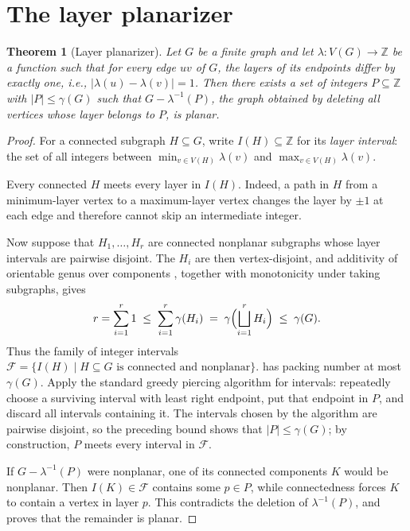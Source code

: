 \documentclass[11pt]{article}
\newtheorem{theorem}{Theorem}[section]
\theoremstyle{definition}
\theoremstyle{remark}
\newcommand{\genus}{\gamma}
\newcommand{\layer}{\lambda}
\begin{document}
\section{The layer planarizer}\label{sec:planarizer}

\begin{theorem}[Layer planarizer]\label{thm:planarizer}
Let $G$ be a finite graph and let $\layer\colon V(G)\to\mathbb{Z}$ be a function such that
for every edge $uv$ of $G$, the layers of its endpoints differ by exactly one, i.e., $|\layer(u)-\layer(v)|=1$. Then there exists
a set of integers $P\subseteq\mathbb{Z}$ with $|P|\le\genus(G)$ such that
$G-\layer^{-1}(P)$, the graph obtained by deleting all vertices whose layer belongs to $P$,
is planar.
\end{theorem}

\begin{proof}
For a connected subgraph $H\subseteq G$, write $I(H)\subseteq\mathbb{Z}$ for its
\emph{layer interval}: the set of all integers between $\min_{v\in V(H)}\layer(v)$ and
$\max_{v\in V(H)}\layer(v)$.

Every connected $H$ meets every layer in $I(H)$.  Indeed, a path in $H$ from a
minimum-layer vertex to a maximum-layer vertex changes the layer by $\pm1$ at each
edge and therefore cannot skip an intermediate integer.

Now suppose that $H_1,\dots,H_r$ are connected nonplanar subgraphs whose layer
intervals are pairwise disjoint.  The $H_i$ are then vertex-disjoint, and additivity
of orientable genus over components \cite{BHKY62}, together with monotonicity under
taking subgraphs, gives
\[
r = \sum_{i=1}^{r} 1 \;\le\; \sum_{i=1}^{r} \genus(H_i) \;=\; \genus\Bigl(\bigsqcup_{i=1}^r H_i\Bigr) \;\le\; \genus(G).
\]
Thus the family of integer intervals
$\mathcal{F} = \{I(H) \mid H\subseteq G \text{ is connected and nonplanar}\}$.
has packing number at most $\genus(G)$.  Apply the standard greedy piercing
algorithm for intervals: repeatedly choose a surviving interval with least right
endpoint, put that endpoint in $P$, and discard all intervals containing it.  The
intervals chosen by the algorithm are pairwise disjoint, so the preceding bound
shows that $|P|\le\genus(G)$; by construction, $P$ meets every interval in
$\mathcal{F}$.

If $G-\layer^{-1}(P)$ were nonplanar, one of its connected components $K$ would be
nonplanar.  Then $I(K)\in\mathcal{F}$ contains some $p\in P$, while connectedness
forces $K$ to contain a vertex in layer $p$.  This contradicts the deletion of
$\layer^{-1}(P)$, and proves that the remainder is planar.
\end{proof}
\end{document}
